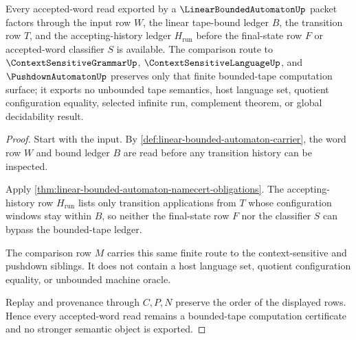 \begin{theorem}
\label{thm:linear-bounded-automaton-bounded-tape-route}
Every accepted-word read exported by a $\LinearBoundedAutomatonUp$ packet factors through the input row $W$, the linear tape-bound ledger $B$, the transition row $T$, and the accepting-history ledger $H_{\mathrm{run}}$ before the final-state row $F$ or accepted-word classifier $S$ is available. The comparison route to $\ContextSensitiveGrammarUp$, $\ContextSensitiveLanguageUp$, and $\PushdownAutomatonUp$ preserves only that finite bounded-tape computation surface; it exports no unbounded tape semantics, host language set, quotient configuration equality, selected infinite run, complement theorem, or global decidability result.
\end{theorem}
\begin{proof}
Start with the input. By \autoref{def:linear-bounded-automaton-carrier}, the word row $W$ and bound ledger $B$ are read before any transition history can be inspected.

Apply \autoref{thm:linear-bounded-automaton-namecert-obligations}. The accepting-history row $H_{\mathrm{run}}$ lists only transition applications from $T$ whose configuration windows stay within $B$, so neither the final-state row $F$ nor the classifier $S$ can bypass the bounded-tape ledger.

The comparison row $M$ carries this same finite route to the context-sensitive and pushdown siblings. It does not contain a host language set, quotient configuration equality, or unbounded machine oracle.

Replay and provenance through $C,P,N$ preserve the order of the displayed rows. Hence every accepted-word read remains a bounded-tape computation certificate and no stronger semantic object is exported.
\end{proof}



